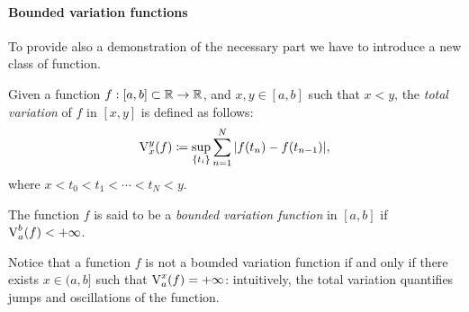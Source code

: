 \paragraph{Bounded variation functions} To provide also a demonstration of the necessary part we have to introduce a new class of function.
\begin{defn}
	Given a function $f:[a,b] \subset \mathbb R \to \mathbb R$, and $x,y\in [a,b]$ such that $x<y$, the \emph{total variation} of $f$ in $[x,y]$ is defined as follows:
	$$
	\operatorname{V}^y_x(f) 
	\coloneqq \sup_{\{t_i\}} \sum_{n=1}^{N}|f(t_n)-f(t_{n-1})|
	,
	$$
	where $x<t_0<t_1<\cdots<t_N<y$.
	
	The function $f$ is said to be a \emph{bounded variation function} in $[a,b]$ if $\operatorname{V}^b_a (f) < +\infty$.
\end{defn}

Notice that a function $f$ is not a bounded variation function if and only if there exists $x \in (a,b]$ such that $\operatorname{V}^x_a (f) = +\infty$: intuitively, the total variation quantifies jumps and oscillations of the function.

